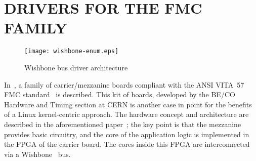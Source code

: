 \documentclass{JAC2003}
\begin{document}
\section{DRIVERS FOR THE FMC FAMILY}

\begin{figure}[t]
   \centering
   \texttt{[image: wishbone-enum.eps]}
   \caption{Wishbone bus driver architecture}
   \label{wishbone-enum}
\end{figure}


In~\cite{fpga-fmc}, a family of carrier/mezzanine boards compliant 
with the ANSI VITA~57 FMC standard~\cite{vita-fmc} is described. This kit of boards,
developed by the BE/CO Hardware and Timing section at CERN is
another case in point for the benefits of a Linux kernel-centric
approach. The hardware concept and architecture are described
in the aforementioned paper~\cite{fpga-fmc}; the key point is that the
mezzanine provides basic circuitry, and the core of the application
logic is implemented in the FPGA of the carrier board. The cores inside
this FPGA are interconnected via a Wishbone~\cite{wishbone-spec} bus.
\end{document}
